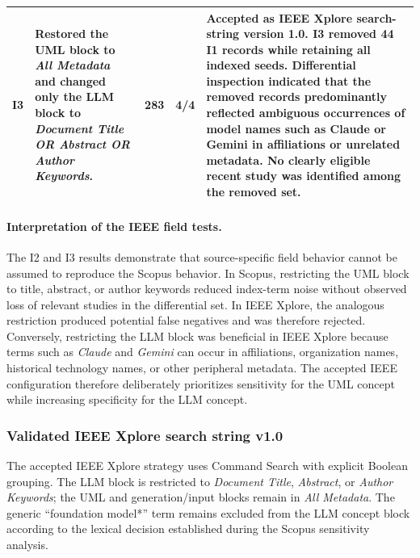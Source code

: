 \begin{longtable}{p{} p{} p{} p{} p{}}
I3 & Restored the UML block to \emph{All Metadata} and changed only the LLM block to \emph{Document Title OR Abstract OR Author Keywords}. & 283 & 4/4 & Accepted as IEEE Xplore search-string version 1.0. I3 removed 44 I1 records while retaining all indexed seeds. Differential inspection indicated that the removed records predominantly reflected ambiguous occurrences of model names such as Claude or Gemini in affiliations or unrelated metadata. No clearly eligible recent study was identified among the removed set. \\
\bottomrule
\end{longtable}

\paragraph{Interpretation of the IEEE field tests.}
The I2 and I3 results demonstrate that source-specific field behavior cannot be
assumed to reproduce the Scopus behavior. In Scopus, restricting the UML block
to title, abstract, or author keywords reduced index-term noise without observed
loss of relevant studies in the differential set. In IEEE Xplore, the analogous
restriction produced potential false negatives and was therefore rejected.
Conversely, restricting the LLM block was beneficial in IEEE Xplore because
terms such as \emph{Claude} and \emph{Gemini} can occur in affiliations,
organization names, historical technology names, or other peripheral metadata.
The accepted IEEE configuration therefore deliberately prioritizes sensitivity
for the UML concept while increasing specificity for the LLM concept.

\subsubsection{Validated IEEE Xplore search string v1.0}

The accepted IEEE Xplore strategy uses Command Search with explicit Boolean
grouping. The LLM block is restricted to \emph{Document Title}, \emph{Abstract},
or \emph{Author Keywords}; the UML and generation/input blocks remain in
\emph{All Metadata}. The generic ``foundation model*'' term remains excluded
from the LLM concept block according to the lexical decision established during
the Scopus sensitivity analysis.

